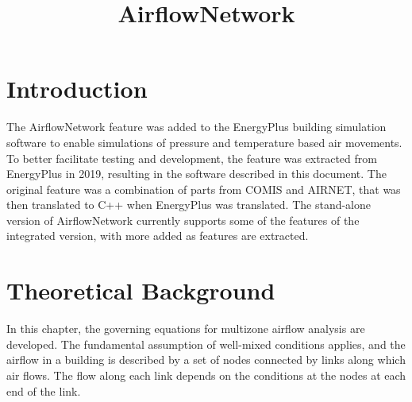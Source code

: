 \documentclass[10pt]{report}
\begin{document}
\begin{titlepage}
\title{AirflowNetwork}
\maketitle
\end{titlepage}
\tableofcontents{}
\chapter{Introduction}
The AirflowNetwork feature was added to the EnergyPlus building simulation software
to enable simulations of pressure and temperature based air movements. To better
facilitate testing and development, the feature was extracted from EnergyPlus in
2019, resulting in the software described in this document. The original feature was
a combination of parts from COMIS and AIRNET, that was then translated to C++ when
EnergyPlus was translated. The stand-alone version of AirflowNetwork currently
supports some of the features of the integrated version, with more added as features
are extracted.

\chapter{Theoretical Background}
In this chapter, the governing equations for multizone airflow analysis are developed. The fundamental assumption of well-mixed conditions applies, and the airflow in a building is described by a set of nodes connected by links along which air flows. The flow along each link depends on the conditions at the nodes at each end of the link. 
%
\end{document}
